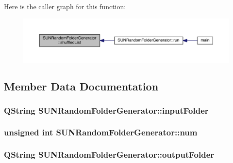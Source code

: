 Here is the caller graph for this function\+:\nopagebreak
\begin{figure}[H]
\begin{center}
\leavevmode
\includegraphics[width=350pt]{class_s_u_n_random_folder_generator_a515728ee2e168336b2e0e0f72cc86813_icgraph}
\end{center}
\end{figure}




\subsection{Member Data Documentation}
\hypertarget{class_s_u_n_random_folder_generator_a3f9525ed0cca76258f89630fa1b23512}{
\subsubsection[{input\+Folder}]{\setlength{\rightskip}{0pt plus 5cm}Q\+String S\+U\+N\+Random\+Folder\+Generator\+::input\+Folder\hspace{0.3cm}{\ttfamily [private]}}}\label{class_s_u_n_random_folder_generator_a3f9525ed0cca76258f89630fa1b23512}
\hypertarget{class_s_u_n_random_folder_generator_a0fdde54a3c62efd013f0b05c49abd884}{
\subsubsection[{num}]{\setlength{\rightskip}{0pt plus 5cm}unsigned int S\+U\+N\+Random\+Folder\+Generator\+::num\hspace{0.3cm}{\ttfamily [private]}}}\label{class_s_u_n_random_folder_generator_a0fdde54a3c62efd013f0b05c49abd884}
\hypertarget{class_s_u_n_random_folder_generator_a3a23fbc7b969530de102838cf9566f3e}{
\subsubsection[{output\+Folder}]{\setlength{\rightskip}{0pt plus 5cm}Q\+String S\+U\+N\+Random\+Folder\+Generator\+::output\+Folder\hspace{0.3cm}{\ttfamily [private]}}}\label{class_s_u_n_random_folder_generator_a3a23fbc7b969530de102838cf9566f3e}


